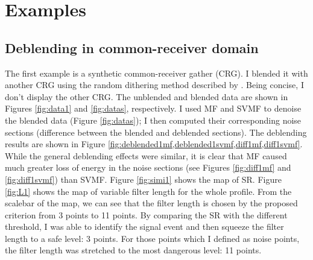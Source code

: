 



\section{Examples}
\subsection{Deblending in common-receiver domain}
The first example is a synthetic common-receiver gather (CRG).  I blended it with another CRG using the random dithering method described by \cite{yangkang20131}. Being concise, I don't display the other CRG. The unblended and blended data are shown in Figures \ref{fig:data1} and \ref{fig:datas}, respectively. I used MF and SVMF to denoise the blended data (Figure \ref{fig:datas}); I then computed their corresponding noise sections (difference between the blended and deblended sections). The deblending results are shown in Figure \ref{fig:deblended1mf,deblended1svmf,diff1mf,diff1svmf}. While the general deblending effects were similar, it is clear that MF caused much greater loss of energy in the noise sections (see Figures \ref{fig:diff1mf} and \ref{fig:diff1svmf}) than SVMF.  Figure \ref{fig:simi1} shows the map of SR. Figure \ref{fig:L1} shows the map of variable filter length for the whole profile. From the scalebar of the map, we can see that the filter length is chosen by the proposed criterion from 3 points to 11 points. By comparing the SR with the different threshold, I was able to identify the signal event and then squeeze the filter length to a safe level: 3 points. For those points which I defined as noise points, the filter length was stretched to the most dangerous level: 11 points. 


